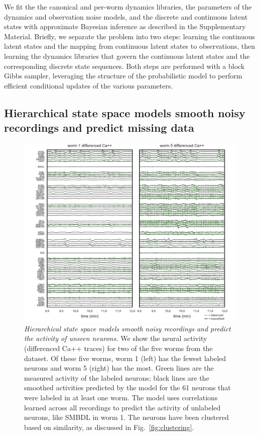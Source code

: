 \documentclass[11pt]{article}
\begin{document}
We fit the the canonical and per-worm dynamics libraries, the
parameters of the dynamics and observation noise models, and the
discrete and continuous latent states with approximate Bayesian
inference as described in the Supplementary Material. Briefly, we
separate the problem into two steps: learning the continuous latent
states and the mapping from continuous latent states to observations,
then learning the dynamics libraries that govern the continuous latent
states and the corresponding discrete state sequences.  Both steps are
performed with a block Gibbs sampler, leveraging the structure of the
probabilistic model to perform efficient conditional updates of the
various parameters. 

\subsection*{Hierarchical state space models smooth noisy recordings and predict missing data}

\begin{figure}[t!]
\centering
\includegraphics[width=6in]{figures/v3/figure2} 
\caption{ \textit{Hierarchical state space models smooth noisy
    recordings and predict the activity of unseen neurons.}  We show
  the neural activity (differenced Ca++ traces) for two of the
  five worms from the \citet{kato2015global} dataset.  Of these five
  worms, worm 1 (left) has the fewest labeled neurons and worm 5
  (right) has the most.  Green lines are the measured activity of the
  labeled neurons; black lines are the smoothed activities predicted
  by the model for the 61 neurons that were labeled in at least one
  worm.  The model uses correlations learned across all recordings to
  predict the activity of unlabeled neurons, like \textsf{SMBDL} in
  worm 1.  The neurons have been clustered based on similarity, as
  discussed in Fig.~\ref{fig:clustering}.  }
\label{fig:smoothing}
\end{figure}
\end{document}
